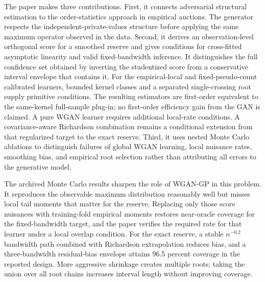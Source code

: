 The paper makes three contributions. First, it connects adversarial structural
estimation to the order-statistics approach in empirical auctions. The
generator respects the independent-private-values structure before applying
the same maximum operator observed in the data. Second, it derives an
observation-level orthogonal score for a smoothed reserve and gives
conditions for cross-fitted asymptotic linearity and valid fixed-bandwidth
inference. It distinguishes the full confidence set obtained by inverting
the studentized score from a conservative interval envelope that contains it.
For the empirical-local and fixed-pseudo-count calibrated learners,
bounded kernel classes and a separated single-crossing root supply primitive
conditions. The resulting estimators are first-order equivalent to the
same-kernel full-sample plug-in; no first-order efficiency gain from the GAN is
claimed. A pure WGAN learner requires additional local-rate conditions.
A covariance-aware Richardson combination remains a conditional extension
from that regularized target to the exact reserve. Third, it uses nested Monte
Carlo ablations to distinguish failures of global WGAN learning, local nuisance
rates, smoothing bias, and empirical root selection rather than attributing all
errors to the generative model.

The archived Monte Carlo results sharpen the role of WGAN-GP in this problem. It reproduces the
observable maximum distribution reasonably well but misses local tail moments
that matter for the reserve. Replacing only those score nuisances with
training-fold empirical moments restores near-oracle coverage for the
fixed-bandwidth target, and the paper verifies the required rate for that
learner under a local overlap condition. For the exact reserve, a stable
$n^{-0.2}$ bandwidth
path combined with Richardson extrapolation reduces bias, and a
three-bandwidth residual-bias envelope attains 96.5 percent coverage in the
reported design. More aggressive shrinkage creates multiple roots; taking the
union over all root chains increases interval length without improving
coverage.

